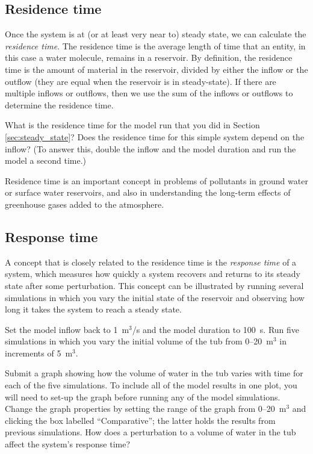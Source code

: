 \documentclass[11pt,letterpaper]{article}
\begin{document}
\subsection{Residence time\label{sec:residence_time}}
Once the system is at (or at least very near to) steady state, we can calculate the \textit{residence time}. The residence time is the average length of time that an entity, in this case a water molecule, remains in a reservoir. By definition, the residence time is the amount of material in the reservoir, divided by either the inflow or the outflow (they are equal when the reservoir is in steady-state). If there are multiple inflows or outflows, then we use the sum of the inflows or outflows to determine the residence time. 

What is the residence time for the model run that you did in Section \ref{sec:steady_state}? Does the residence time for this simple system depend on the inflow? (To answer this, double the inflow and the model duration and run the model a second time.)

Residence time is an important concept in problems of pollutants in ground water or surface water reservoirs, and also in understanding the long-term effects of greenhouse gases added to the atmosphere.

\subsection{Response time}
A concept that is closely related to the residence time is the \textit{response time} of a system, which measures how quickly a system recovers and returns to its steady state after some perturbation. This concept can be illustrated by running several simulations in which you vary the initial state of the reservoir and observing how long it takes the system to reach a steady state. 

Set the model inflow back to 1~m$^3$/s and the model duration to 100~s. Run five simulations in which you vary the initial volume of the tub from 0--20~m$^3$ in increments of 5~m$^3$.

Submit a graph showing how the volume of water in the tub varies with time for each of the five simulations. To include all of the model results in one plot, you will need to set-up the graph before running any of the model simulations. Change the graph properties by setting the range of the graph from 0--20~m$^3$ and clicking the box labelled ``Comparative''; the latter holds the results from previous simulations. How does a perturbation to a volume of water in the tub affect the system's response time?
\end{document}
